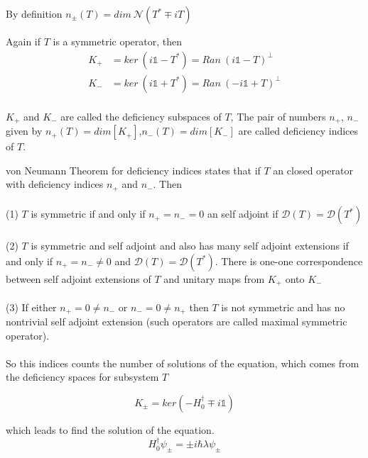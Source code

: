 \documentclass[12pt]{report}
\newcommand*{\1}{\hspace{1pt}}
\begin{document}
        By definition $n_{\pm} (T) = dim \ \mathcal{N}(T^{*} \mp iT )$ 

        Again if $T$ is a symmetric operator, then
        \begin{equation}
            \begin{split}
                K_{+} &= ker \ (i\mathds{1}-T^{*}) = Ran \ (i\mathds{1} - T) ^{\perp} \\
                K_{-} &= ker \ (i \mathds{1} +T^{*}) = Ran \ (-i\mathds{1} + T) ^{\perp} \\ 
            \end{split}
        \end{equation}
        
        $K_{+}$ and $K_{-}$ are called the deficiency subspaces of $T$, The pair of numbers $n_{+}$, $n_{-}$ given by $n_{+}(T) = dim[K_{+}]$,$n_{-}(T) = dim[K_{-}]$ are called
        deficiency indices of $T$.

        von Neumann Theorem for deficiency indices states that if $T$ an closed operator with deficiency indices $n_{+}$ and $n_{-}$. Then \\ 
        \\
         (1) $T$ is symmetric if and only if $n_{+} = n_{-} = 0$ an self adjoint if $\mathcal{D}(T)=\mathcal{D}(T^{*})$ \\ 
         \\ 
         (2) $T$ is symmetric and self adjoint and also has many self adjoint extensions if and only if $n_{+}=n_{-}\neq 0$ and  $\mathcal{D}(T)=\mathcal{D}(T^{*})$.
         There is one-one correspondence between self adjoint extensions of $T$ and unitary maps from $K_{+}$ onto $K_{-}$ \\ 
         \\ 
         (3) If either $n_{+}=0 \neq n_{-}$ or $n_{-}=0 \neq n_{+}$ then $T$ is not symmetric and has no nontrivial self adjoint extension (such operators are called 
         maximal symmetric operator). \\
         \\
        So this indices counts the number of solutions of the equation, which comes from the deficiency spaces for subsystem $T$

        \begin{equation}
            K_{\pm} = ker \left(-H_{0}^{\dagger}  \mp i \mathds{1}\right)
        \end{equation}

        which leads to find the solution of the equation.
        \begin{equation}
            H_{0} ^{\dagger} \psi_{\pm} = \pm i \hbar \lambda \psi_{\pm}
        \end{equation}
\end{document}
